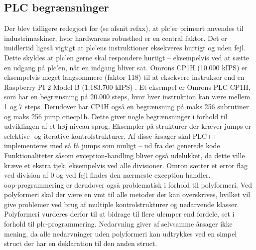 \subsection{PLC begrænsninger}\label{sec:plcprob}
Der blev tidligere redegjort for (se afsnit refxx), at \gls{plc}’er primært anvendes til industrimaskiner, hvor hardwarens robusthed er en central faktor. Det er imidlertid ligeså vigtigt at \gls{plc}’ens instruktioner eksekveres hurtigt og uden fejl. Dette skyldes at \gls{plc}’en gerne skal respondere hurtigt – eksempelvis ved at sætte en udgang på \gls{plc}’en, når en indgang bliver sat. Omrons CP1H (10.000 kIPS) er eksempelvis meget langsommere (faktor 118) til at eksekvere instrukser end en Raspberry PI 2 Model B (1.183.700 kIPS) \cite{raspBench}. Et eksempel er Omrons PLC CP1H, som har en begrænsning på 20.000 steps, hvor hver instruktion kan være mellem 1 og 7 steps. Derudover har CP1H også en begrænsning på maks 256 subrutiner og maks 256 jump cite{cp1h}. Dette giver nogle begrænsninger i forhold til udviklingen af et høj niveau sprog. Eksempler på strukturer der kræver jumps er selektive- og iterative kontrolstrukturer. Af disse årsager skal PLC++ implementeres med så få jumps som muligt – ud fra det generede kode. Funktionaliteter såsom exception-handling bliver også udelukket, da dette ville kræve et ekstra tjek, eksempelvis ved alle divisioner. Omron sætter et error flag ved division af 0 og ved fejl findes den nærmeste exception handler. \cite{exceptionHandling}\\





\noindent \gls{oop}-programmering er derudover også problematisk i forhold til polyformeri. Ved polyformeri skal der være en \gls{vmt} til alle metoder der kan overskrives, hvilket vil give problemer ved brug af multiple kontrolstrukturer og nedarvende klasser. Polyformeri vurderes derfor 
til at bidrage til flere ulemper end fordele, set i forhold til \gls{plc}-programmering. Nedarvning giver af selvsamme årsager ikke mening, da alle nedarvninger uden polyformeri kan udtrykkes ved en simpel struct der har en deklaration til den anden struct. \cite{Sebesta_2013}\\ 

